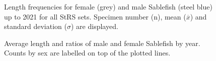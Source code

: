 \documentclass[12pt]{article}\usepackage[]{graphicx}\usepackage[]{color}
\begin{document}
\begin{figure}[htb]

{\centering {} 

}

\caption{Length frequencies for female (grey) and male Sablefish (steel blue) up to 2021 for all StRS sets. Specimen number (n), mean (\(\overline{x}\)) and standard deviation (\(\sigma\)) are displayed.}\label{fig:figure12}
\end{figure}

\begin{figure}[htb]

{\centering {} 

}

\caption{Average length and ratios of male and female Sablefish by year. Counts by sex are labelled on top of the plotted lines.}\label{fig:figure13}
\end{figure}
\clearpage
\end{document}
